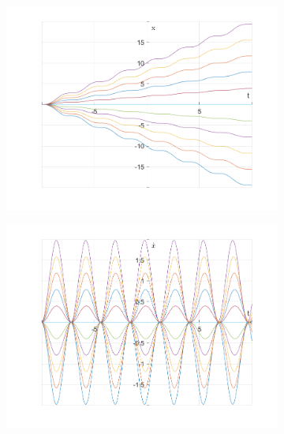 \documentclass{article}
\begin{document}
	\begin{figure}[h!]
		\centering
		\begin{subfigure}[b]{0.48\linewidth}
			\includegraphics[width=\linewidth]{./SmallOscillations/S9/F3.png}
		\end{subfigure}
		\begin{subfigure}[b]{0.48\linewidth}
			\includegraphics[width=\linewidth]{./SmallOscillations/S9/F4.png}
		\end{subfigure}
	\end{figure}
	
\end{document}
